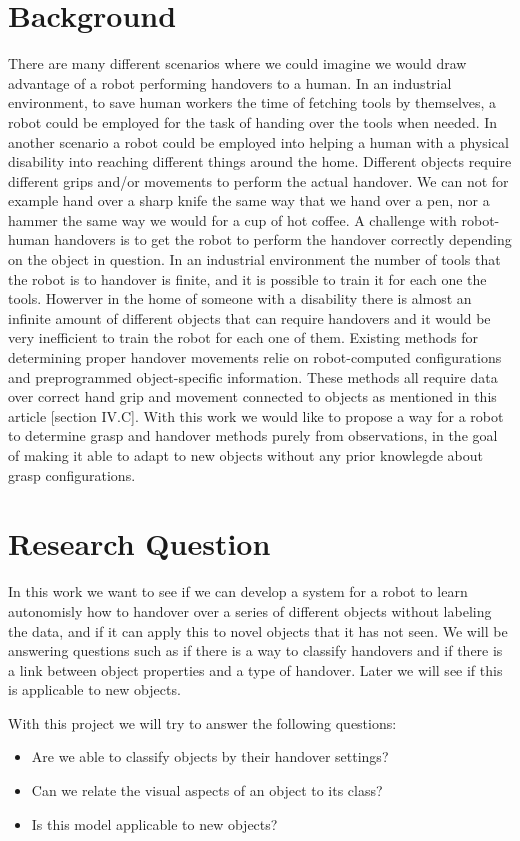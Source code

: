 \section{Background}

There are many different scenarios where we could imagine we would draw advantage of a robot performing handovers to a human. In an industrial environment, to save human workers the time of fetching tools by themselves, a robot could be employed for the task of handing over the tools when needed. In another scenario a robot could be employed into helping a human with a physical disability into reaching different things around the home. Different objects require different grips and/or movements to perform the actual handover. We can not for example hand over a sharp knife the same way that we hand over a pen, nor a hammer the same way we would for a cup of hot coffee. A challenge with robot-human handovers is to get the robot to perform the handover correctly depending on the object in question. In an industrial environment the number of tools that the robot is to handover is finite, and it is possible to train it for each one the tools. Howerver in the home of someone with a disability there is almost an infinite amount of different objects that can require handovers and it would be very inefficient to train the robot for each one of them. Existing methods for determining proper handover movements relie on robot-computed configurations and preprogrammed object-specific information. These methods all require data over correct hand grip and movement connected to objects as mentioned in this article [section IV.C]. With this work we would like to propose a way for a robot to determine grasp and handover methods purely from observations, in the goal of making it able to adapt to new objects without any prior knowlegde about grasp configurations.

\section{Research Question}

In this work we want to see if we can develop a system for a robot to learn autonomisly how to handover over a series of different objects without labeling the data, and if it can apply this to novel objects that it has not seen. We will be answering questions such as if there is a way to classify handovers and if there is a link between object properties and a type of handover. Later we will see if this is applicable to new objects.

With this project we will try to answer the following questions:
\begin{itemize}
	\item Are we able to classify objects by their handover settings?
	\item Can we relate the visual aspects of an object to its class?
	\item Is this model applicable to new objects?
\end{itemize}
